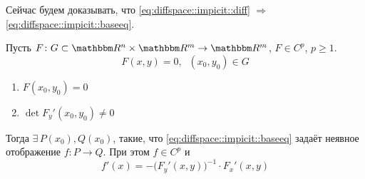 \documentclass[12pt,trimbord]{../../../notes}
\begin{document}
Сейчас будем доказывать, что \eqref{eq:diffspace::impicit::diff} $\Rightarrow$ \eqref{eq:diffspace::impicit::baseeq}.


\begin{thrm}\label{thrm:diffspace::implicit}
  Пусть $F\colon G \subset \R^n \times \R^m \to \R^m $, $F \in C^p$, $p \geqslant 1$.
  \[
    F(x, y) = 0, \;\; (x_0, y_0) \in G
  \]
  \begin{enumerate}
    \item $F(x_0, y_0) = 0 $
    \item $\det F_y'(x_0, y_0) \neq 0$
  \end{enumerate}

  Тогда $\exists\, P(x_0), Q(x_0)$, такие, что \eqref{eq:diffspace::impicit::baseeq} задаёт
  неявное отображение $f\colon P \to Q$. При этом $f\in C^p$ и 
  \[
    f'(x) = - \bigl(F_y'(x,y)\bigr)^{-1} \cdot F_x'(x,y)
  \]
\end{thrm}
\end{document}
